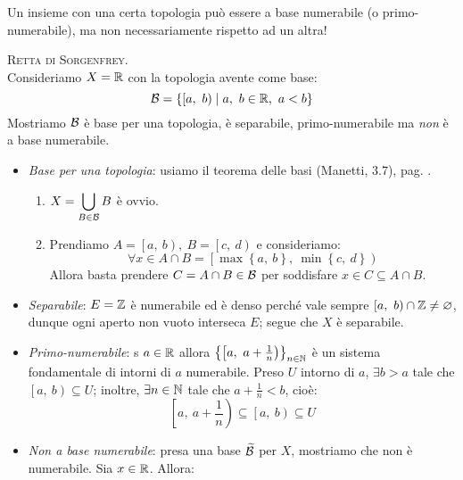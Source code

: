 \begin{attention}
Un insieme con una certa topologia può essere a base numerabile (o primo-numerabile), ma non necessariamente rispetto ad un altra!
\end{attention}
\begin{example}
\textsc{Retta di Sorgenfrey}.\\
Consideriamo $X=\mathbb{R}$ con la topologia avente come base:
\begin{equation}
\basis=\left\{\left[a,\ b\right)\mid a,\ b\in\realset,\ a<b\right\}
\end{equation}
Mostriamo $\mathcal{B}$ è base per una topologia, è separabile, primo-numerabile ma \textit{non} è a base numerabile.
\begin{itemize}
	\item \textit{Base per una topologia}: usiamo il teorema delle basi (Manetti, 3.7), pag. \pageref{teoremabasi}.
	\begin{enumerate}[label=\Roman*]
		\item $\displaystyle X=\mathop{{\bigcup}}\displaylimits_{B\in \mathcal{B}}B$ è ovvio.
		\item Prendiamo $A=\left[a,\ b\right),\ B=\left[c,\ d\right)$ e consideriamo:
		\begin{equation*}
			\forall x\in A\cap B=\left[\max\left\{a,\ b\right\},\ \min\left\{c,\ d\right\}\right)
		\end{equation*}
	Allora basta prendere $C=A\cap B\in\mathcal{B}$ per soddisfare $x\in C\subseteq A\cap B$.
	\end{enumerate}
\item \textit{Separabile}: $E=\mathbb{Z}$ è numerabile ed è denso perché vale sempre $\left[a,\ b\right)\cap \mathbb{Z} \neq \varnothing$, dunque ogni aperto non vuoto interseca $E$; segue che $X$ è separabile.
\item \textit{Primo-numerabile}: s $a\in\mathbb{R}$ allora $\left\{\left[a,\ a+\frac{1}{n}\right)\right\}_{n\in\naturalset}$ è un sistema fondamentale di intorni di $a$ numerabile. Preso $U$ intorno di $a$, $\exists b>a$ tale che $\left[a,\ b\right)\subseteq U$; inoltre, $\exists n\in\mathbb{N}$ tale che $a+\frac{1}{n}<b$, cioè:
\begin{equation*}
\left[a,\ a+\frac{1}{n}\right)\subseteq\left[a,\ b\right)\subseteq U
\end{equation*}
\item \textit{Non a base numerabile}: presa una base $\widetilde{\mathcal{B}}$ per $X$, mostriamo che non è numerabile. Sia $x\in\mathbb{R}$. Allora:
\begin{equation*}

\end{equation*}
\end{itemize}
\end{example}
